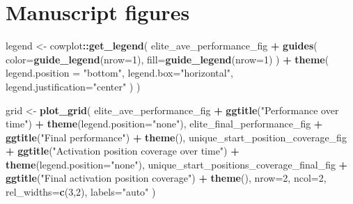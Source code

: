 \documentclass[]{book}
\newenvironment{Shaded}{\begin{snugshade}}{\end{snugshade}}
\newcommand{\DataTypeTok}[1]{\textcolor[rgb]{0.13,0.29,0.53}{#1}}
\newcommand{\DecValTok}[1]{\textcolor[rgb]{0.00,0.00,0.81}{#1}}
\newcommand{\KeywordTok}[1]{\textcolor[rgb]{0.13,0.29,0.53}{\textbf{#1}}}
\newcommand{\NormalTok}[1]{#1}
\newcommand{\OperatorTok}[1]{\textcolor[rgb]{0.81,0.36,0.00}{\textbf{#1}}}
\newcommand{\StringTok}[1]{\textcolor[rgb]{0.31,0.60,0.02}{#1}}
\begin{document}
\hypertarget{manuscript-figures-3}{%
\section{Manuscript figures}\label{manuscript-figures-3}}

\begin{Shaded}
\begin{Highlighting}[]
\NormalTok{legend <-}\StringTok{ }\NormalTok{cowplot}\OperatorTok{::}\KeywordTok{get_legend}\NormalTok{(}
\NormalTok{    elite_ave_performance_fig }\OperatorTok{+}
\StringTok{      }\KeywordTok{guides}\NormalTok{(}
        \DataTypeTok{color=}\KeywordTok{guide_legend}\NormalTok{(}\DataTypeTok{nrow=}\DecValTok{1}\NormalTok{),}
        \DataTypeTok{fill=}\KeywordTok{guide_legend}\NormalTok{(}\DataTypeTok{nrow=}\DecValTok{1}\NormalTok{)}
\NormalTok{      ) }\OperatorTok{+}
\StringTok{      }\KeywordTok{theme}\NormalTok{(}
        \DataTypeTok{legend.position =} \StringTok{"bottom"}\NormalTok{,}
        \DataTypeTok{legend.box=}\StringTok{"horizontal"}\NormalTok{,}
        \DataTypeTok{legend.justification=}\StringTok{"center"}
\NormalTok{      )}
\NormalTok{  )}

\NormalTok{grid <-}\StringTok{ }\KeywordTok{plot_grid}\NormalTok{(}
\NormalTok{  elite_ave_performance_fig }\OperatorTok{+}
\StringTok{    }\KeywordTok{ggtitle}\NormalTok{(}\StringTok{"Performance over time"}\NormalTok{) }\OperatorTok{+}
\StringTok{    }\KeywordTok{theme}\NormalTok{(}\DataTypeTok{legend.position=}\StringTok{"none"}\NormalTok{),}
\NormalTok{  elite_final_performance_fig }\OperatorTok{+}
\StringTok{    }\KeywordTok{ggtitle}\NormalTok{(}\StringTok{"Final performance"}\NormalTok{) }\OperatorTok{+}
\StringTok{    }\KeywordTok{theme}\NormalTok{(),}
\NormalTok{  unique_start_position_coverage_fig }\OperatorTok{+}
\StringTok{    }\KeywordTok{ggtitle}\NormalTok{(}\StringTok{"Activation position coverage over time"}\NormalTok{) }\OperatorTok{+}
\StringTok{    }\KeywordTok{theme}\NormalTok{(}\DataTypeTok{legend.position=}\StringTok{"none"}\NormalTok{),}
\NormalTok{  unique_start_positions_coverage_final_fig }\OperatorTok{+}
\StringTok{    }\KeywordTok{ggtitle}\NormalTok{(}\StringTok{"Final activation position coverage"}\NormalTok{) }\OperatorTok{+}
\StringTok{    }\KeywordTok{theme}\NormalTok{(),}
  \DataTypeTok{nrow=}\DecValTok{2}\NormalTok{,}
  \DataTypeTok{ncol=}\DecValTok{2}\NormalTok{,}
  \DataTypeTok{rel_widths=}\KeywordTok{c}\NormalTok{(}\DecValTok{3}\NormalTok{,}\DecValTok{2}\NormalTok{),}
  \DataTypeTok{labels=}\StringTok{"auto"}
\NormalTok{)}


\end{Highlighting}
\end{Shaded}
\end{document}

